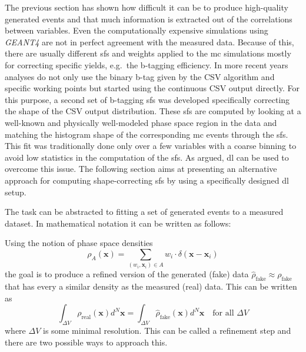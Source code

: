 
\newcommand{\csv}{\text{CSV}}
\newcommand{\sfs}{\glspl{sf}}

\label{sec:deepsf}

The previous section has shown how difficult it can be to produce high-quality generated events and that much information is extracted out of the correlations between variables. Even the computationally expensive simulations using \textit{GEANT4} are not in perfect agreement with the measured data. Because of this, there are usually different \glspl{sf} and weights applied to the \gls{mc} simulations mostly for correcting specific yields, e.g.\ the b-tagging efficiency. In more recent years analyses do not only use the binary b-tag given by the CSV algorithm and specific working points but started using the continuous CSV output directly. For this purpose, a second set of b-tagging \glspl{sf} was developed specifically correcting the shape of the CSV output distribution. These \glspl{sf} are computed by looking at a well-known and physically well-modeled phase space region in the data and matching the histogram shape of the corresponding \gls{mc} events through the \glspl{sf}. This fit was traditionally done only over a few variables with a coarse binning to avoid low statistics in the computation of the \glspl{sf}. As argued, \gls{dl} can be used to overcome this issue. The following section aims at presenting an alternative approach for computing shape-correcting \glspl{sf} by using a specifically designed \gls{dl} setup.

\label{ssec:deepsf-generalization}

The task can be abstracted to fitting a set of generated events to a measured dataset. In mathematical notation it can be written as follows:

Using the notion of phase space densities
\begin{equation}
    \rho_A (\bm x) = \sum_{(w_i, \bm x_i) \in A} w_i \cdot \delta(\bm x - \bm x_i)
\end{equation}
the goal is to produce a refined version of the generated (fake) data \(\hat \rho_\text{fake} \approx \rho_\text{fake}\) that has every a similar density as the measured (real) data. This can be written as
\begin{equation}
    \int_{\Delta V}  \rho_\text{real}(\bm x) d^N \bm x = \int_{\Delta V} \hat\rho_\text{fake}(\bm x) d^N \bm x \quad \text{for all }\Delta V
\end{equation}
where \(\Delta V\) is some minimal resolution. This can be called a refinement step and there are two possible ways to approach this.

